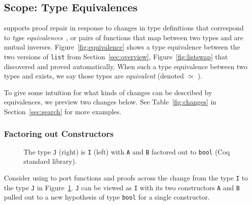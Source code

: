 \subsection{Scope: Type Equivalences}
\label{sec:scope}

\toolname supports proof repair in response to changes in type definitions
that correspond to \textit{type equivalences}~\cite{univalent2013homotopy},
or pairs of functions that map between two types and are mutual inverses.
Figure~\ref{fig:equivalence} shows a type equivalence between the two versions of \lstinline{list}
from Section~\ref{sec:overview}, Figure~\ref{fig:listswap} that \toolname discovered and proved automatically.
When such a type equivalence between two types \A and \B exists, we say those types are \textit{equivalent} (denoted \A $\simeq$ \B). %
%

To give some intuition for what kinds of changes can be described by equivalences, we preview two changes below.
See Table~\ref{fig:changes} in Section~\ref{sec:search} for more examples.

\subsubsection*{Factoring out Constructors}
\label{sec:ex1}

\begin{figure}
\begin{minipage}{0.48\columnwidth}

\end{minipage}
\hfill
\begin{minipage}{0.48\columnwidth}

\end{minipage}
\vspace{-0.3cm}
\caption{The type \lstinline{J} (right) is \lstinline{I} (left) with \lstinline{A} and \lstinline{B} factored out to \lstinline{bool} (Coq standard library).}
\label{fig:equivalence2}
\end{figure}

Consider using \toolname to port functions and proofs across the change from the type \lstinline{I} to the type \lstinline{J} 
in Figure~\ref{fig:equivalence2}.
\lstinline{J} can be viewed as \lstinline{I} with its two constructors \lstinline{A} and \lstinline{B} pulled out to a
new hypothesis of type \lstinline{bool} for a single constructor.

